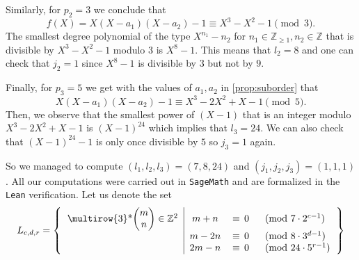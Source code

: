\documentclass[11pt,letterpaper]{amsart}
\theoremstyle{definition}
\theoremstyle{remark}
\newcommand{\bb}[1]{\mathbb{#1}}
\newcommand{\Z}{\bb Z}
\begin{document}
	
	Similarly, for $p_2=3$ we conclude that 
	$$f(X)=X(X-a_1)(X-a_2) - 1 \equiv X^3-X^{2}-1 \pmod{3}.$$
	The smallest degree polynomial of the type $X^{n_1}-n_2$ for $n_1\in \mathbb{Z}_{\geq 1}, n_2 \in \mathbb{Z}$ that is divisible by $X^{3}-X^{2} -1$ modulo $3$ is $X^{8} - 1$. This means that $l_2=8$ and one can check that $j_2=1$ since $X^8-1$ is divisible by $3$ but not by $9$.
	
	Finally, for $p_3=5$ we get with the values of $a_1,a_2$ in \cref{prop:suborder} that
	$$X(X-a_1)(X-a_2) - 1 \equiv X^3-2X^{2} + X-1 \pmod{5}.$$ Then, we observe that the smallest power of $(X-1)$ that is an integer modulo $X^{3}-2X^{2}+X-1$ is $(X-1)^{24}$ which implies that 
	$l_3=24$. We can also check that $(X-1)^{24}-1$ is only once divisible by $5$ so $j_3=1$ again.
	
	
	So we managed to compute $(l_1,l_2,l_3) =(7,8,24)$ and $(j_1,j_2,j_3)=(1,1,1)$. All our computations were carried out in \texttt{SageMath} and are formalized in the \texttt{Lean} verification.
	Let us denote the set
	\begin{equation}\label{eq:defi_of_L}
		L_{c,d,r}=
		\left\lbrace\begin{tabular}{c|ccl}
\multirow{3}*{$\begin{pmatrix}
    m \\
    n
\end{pmatrix} \in \Z^2$} 
& $m+n$  &$\equiv\,0$ &  $\pmod {7\cdot 2^{c-1}}$ \\ 
& $m-2n$ &$\equiv\,0$ &  $\pmod {8\cdot 3^{d-1}}$ \\ 
& $2m-n$ &$\equiv\,0$ &  $\pmod {24\cdot 5^{r-1}}$ 
		\end{tabular}\right\rbrace
	\end{equation}

 
	
\end{document}
